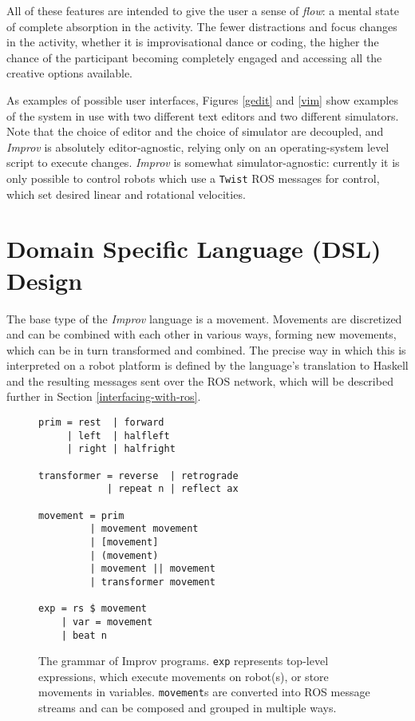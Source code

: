 \documentclass[sigconf]{acmart}
\begin{document}
All of these features are intended to give the user a sense of \emph{flow}: a
mental state of complete absorption in the activity. The fewer distractions and
focus changes in the activity, whether it is improvisational dance or coding,
the higher the chance of the participant becoming completely engaged and
accessing all the creative options available.


As examples of possible user interfaces, Figures \ref{gedit} and \ref{vim} show examples of the system in use with two
different text editors and two different simulators. Note that the choice of
editor and the choice of simulator are decoupled, and \emph{Improv} is
absolutely editor-agnostic, relying only on an operating-system level script
to execute changes. \emph{Improv} is somewhat simulator-agnostic: 
currently it is only possible to control robots which use a \texttt{Twist} ROS messages
for control, which set desired linear and rotational
velocities.


\section{Domain Specific Language (DSL)
Design}\label{domain-specific-language-design}


The base type of the \emph{Improv} language is a movement. Movements are
discretized and can be combined with each other in various ways, forming new
movements, which can be in turn transformed and combined. The precise way in
which this is interpreted on a robot platform is defined by the language's
translation to Haskell and the resulting messages sent over the ROS network,
which will be described further in Section \ref{interfacing-with-ros}.


\begin{figure}[h]
\centering
\begin{verbatim}
prim = rest  | forward 
     | left  | halfleft
     | right | halfright

transformer = reverse  | retrograde 
            | repeat n | reflect ax

movement = prim
         | movement movement
         | [movement]
         | (movement)
         | movement || movement 
         | transformer movement

exp = rs $ movement
    | var = movement
    | beat n
\end{verbatim}
\caption{The grammar of Improv programs. \texttt{exp} represents top-level
expressions, which execute movements on robot(s), or store movements in
variables. \texttt{movement}s are converted into ROS message streams and can be
composed and grouped in multiple ways. \label{grammar}}
\end{figure}
\end{document}
